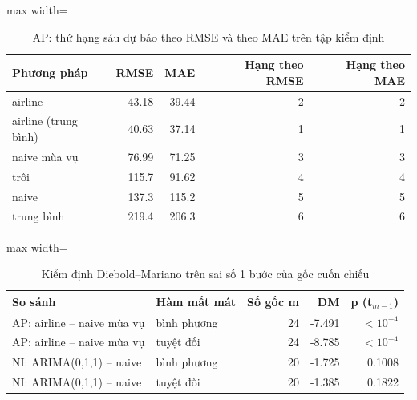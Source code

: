 \begin{table}[H]
\centering\footnotesize
\caption{AP: thứ hạng sáu dự báo theo RMSE và theo MAE trên tập kiểm định}\label{tab:tab_b12_13_ranking}
\begin{adjustbox}{max width=\linewidth}
\begin{tabular}{|l|r|r|r|r|}
\toprule
Phương pháp & RMSE & MAE & Hạng theo RMSE & Hạng theo MAE \\
\midrule
airline & 43.18 & 39.44 & 2 & 2 \\
airline (trung bình) & 40.63 & 37.14 & 1 & 1 \\
naive mùa vụ & 76.99 & 71.25 & 3 & 3 \\
trôi & 115.7 & 91.62 & 4 & 4 \\
naive & 137.3 & 115.2 & 5 & 5 \\
trung bình & 219.4 & 206.3 & 6 & 6 \\
\bottomrule
\end{tabular}
\end{adjustbox}
\end{table}
\begin{table}[H]
\centering\footnotesize
\caption{Kiểm định Diebold–Mariano trên sai số 1 bước của gốc cuốn chiếu}\label{tab:tab_b12_13_diebold_mariano}
\begin{adjustbox}{max width=\linewidth}
\begin{tabular}{|l|l|r|r|r|}
\toprule
So sánh & Hàm mất mát & Số gốc m & DM & p (t$_{m-1}$) \\
\midrule
AP: airline – naive mùa vụ & bình phương & 24 & -7.491 & $<10^{-4}$ \\
AP: airline – naive mùa vụ & tuyệt đối & 24 & -8.785 & $<10^{-4}$ \\
NI: ARIMA(0,1,1) – naive & bình phương & 20 & -1.725 & 0.1008 \\
NI: ARIMA(0,1,1) – naive & tuyệt đối & 20 & -1.385 & 0.1822 \\
\bottomrule
\end{tabular}
\end{adjustbox}
\end{table}
